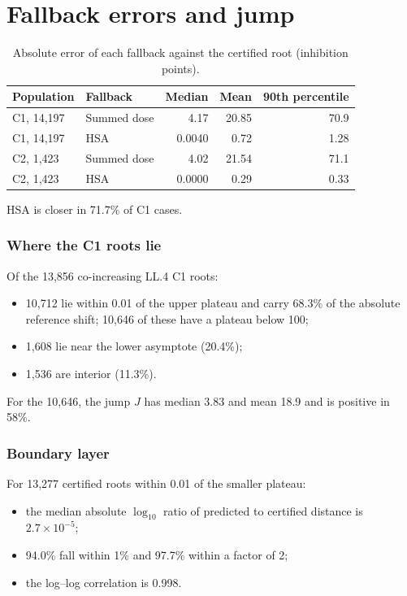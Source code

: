 \documentclass[11pt]{article}
\begin{document}
\section{Fallback errors and jump}\label{sec:S11}
\begin{table}[htbp]
\caption{Absolute error of each fallback against the certified root (inhibition points).}\label{tab:S11}
\centering\small
\begin{tabularx}{\linewidth}{@{}L l r r r@{}}
\toprule
Population & Fallback & Median & Mean & 90th percentile \\
\midrule
C1, 14,197 & Summed dose & 4.17 & 20.85 & 70.9 \\
C1, 14,197 & HSA & 0.0040 & 0.72 & 1.28 \\
C2, 1,423 & Summed dose & 4.02 & 21.54 & 71.1 \\
C2, 1,423 & HSA & 0.0000 & 0.29 & 0.33 \\
\bottomrule
\end{tabularx}
\end{table}
HSA is closer in 71.7\% of C1 cases.

\subsubsection*{Where the C1 roots lie} Of the 13,856 co-increasing LL.4 C1 roots:

\begin{itemize}
\item 10,712 lie within 0.01 of the upper plateau and carry 68.3\% of the absolute reference shift; 10,646 of these have a plateau below 100;
\item 1,608 lie near the lower asymptote (20.4\%);
\item 1,536 are interior (11.3\%).
\end{itemize}
For the 10,646, the jump $J$ has median 3.83 and mean 18.9 and is positive in 58\%.

\subsubsection*{Boundary layer} For 13,277 certified roots within 0.01 of the smaller plateau:

\begin{itemize}
\item the median absolute $\log_{10}$ ratio of predicted to certified distance is $2.7\times10^{-5}$;
\item 94.0\% fall within 1\% and 97.7\% within a factor of 2;
\item the log–log correlation is 0.998.
\end{itemize}
\end{document}
